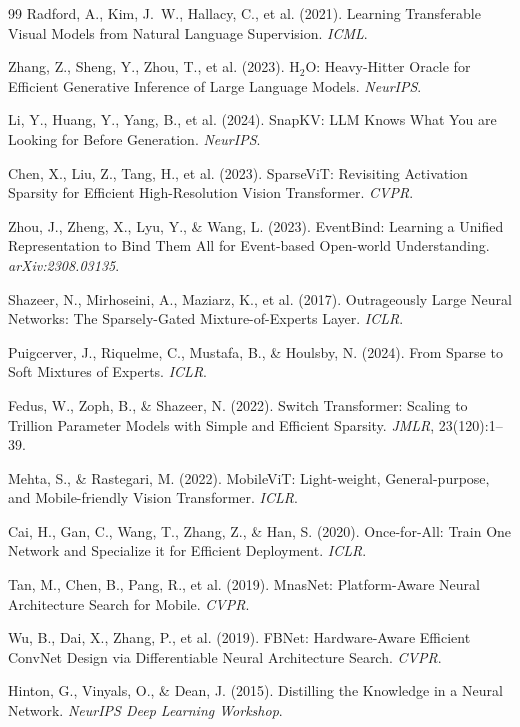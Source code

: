 \documentclass{article}
\begin{document}
{\begin{thebibliography}{99}
Radford, A., Kim, J.~W., Hallacy, C., et al. (2021). Learning Transferable Visual Models from Natural Language Supervision. \emph{ICML}.

Zhang, Z., Sheng, Y., Zhou, T., et al. (2023). H$_2$O: Heavy-Hitter Oracle for Efficient Generative Inference of Large Language Models. \emph{NeurIPS}.

Li, Y., Huang, Y., Yang, B., et al. (2024). SnapKV: LLM Knows What You are Looking for Before Generation. \emph{NeurIPS}.

Chen, X., Liu, Z., Tang, H., et al. (2023). SparseViT: Revisiting Activation Sparsity for Efficient High-Resolution Vision Transformer. \emph{CVPR}.

Zhou, J., Zheng, X., Lyu, Y., \& Wang, L. (2023). EventBind: Learning a Unified Representation to Bind Them All for Event-based Open-world Understanding. \emph{arXiv:2308.03135}.

Shazeer, N., Mirhoseini, A., Maziarz, K., et al. (2017). Outrageously Large Neural Networks: The Sparsely-Gated Mixture-of-Experts Layer. \emph{ICLR}.

Puigcerver, J., Riquelme, C., Mustafa, B., \& Houlsby, N. (2024). From Sparse to Soft Mixtures of Experts. \emph{ICLR}.

Fedus, W., Zoph, B., \& Shazeer, N. (2022). Switch Transformer: Scaling to Trillion Parameter Models with Simple and Efficient Sparsity. \emph{JMLR}, 23(120):1--39.

Mehta, S., \& Rastegari, M. (2022). MobileViT: Light-weight, General-purpose, and Mobile-friendly Vision Transformer. \emph{ICLR}.

Cai, H., Gan, C., Wang, T., Zhang, Z., \& Han, S. (2020). Once-for-All: Train One Network and Specialize it for Efficient Deployment. \emph{ICLR}.

Tan, M., Chen, B., Pang, R., et al. (2019). MnasNet: Platform-Aware Neural Architecture Search for Mobile. \emph{CVPR}.

Wu, B., Dai, X., Zhang, P., et al. (2019). FBNet: Hardware-Aware Efficient ConvNet Design via Differentiable Neural Architecture Search. \emph{CVPR}.

Hinton, G., Vinyals, O., \& Dean, J. (2015). Distilling the Knowledge in a Neural Network. \emph{NeurIPS Deep Learning Workshop}.


\end{thebibliography}}
\end{document}
